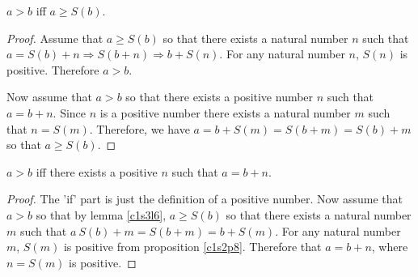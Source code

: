 \begin{lem}\label{c1s3l5}
$a > b$ iff $a \ge S(b)$.
\end{lem}
\begin{proof}
Assume that $a \ge S(b)$ so that there exists a natural number $n$ such 
that $a = S(b) + n \Rightarrow S(b + n) \Rightarrow b + S(n)$. For any 
natural number $n$, $S(n)$ is positive. Therefore $a > b$.

Now assume that $a > b$ so that there exists a positive number $n$ such that
$a = b + n$. Since $n$ is a positive number there exists a natural number
$m$ such that $n = S(m)$. Therefore, we have $a = b + S(m) = S(b + m) = 
S(b) + m$ so that $a \ge S(b)$.
\end{proof}

\begin{lem}\label{c1s3l6}
$a > b$ iff there exists a positive $n$ such that $a = b + n$.
\end{lem}
\begin{proof}
The 'if' part is just the definition of a positive number. Now assume that
$a > b$ so that by lemma \ref{c1s3l6}, $a \ge S(b)$ so that there exists 
a natural number $m$ such that $a \ S(b) + m = S(b + m) = b + S(m)$. For 
any natural number $m$, $S(m)$ is positive from proposition \ref{c1s2p8}.
Therefore that $a = b + n$, where $n =S(m)$ is positive.
\end{proof}
